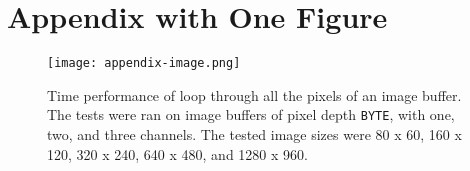 \chapter{Appendix with One Figure}

\begin{figure}[htbp]
\begin{center}
\texttt{[image: appendix-image.png]}
\caption[Example of a figure in the appendix]{Time performance of loop through 
all the pixels of an image buffer. The tests were ran on image buffers of pixel depth \texttt{BYTE}, with 
one, two, and three channels. The tested image sizes were 80 x 60, 160 x 120, 320 x 240, 640 x 480, and 
1280 x 960.}
\end{center}
\end{figure}
